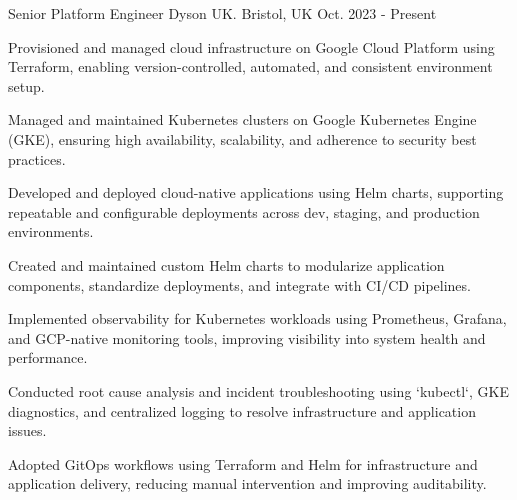 

\begin{cventries}

  \cventry
    {Senior Platform Engineer} %
    {Dyson UK.} %
    {Bristol, UK} %
    {Oct. 2023 - Present} %
    {
      \begin{cvitems} %
        \item {Provisioned and managed cloud infrastructure on Google Cloud Platform using Terraform, enabling version-controlled, automated, and consistent environment setup.}
        \item {Managed and maintained Kubernetes clusters on Google Kubernetes Engine (GKE), ensuring high availability, scalability, and adherence to security best practices.}
        \item {Developed and deployed cloud-native applications using Helm charts, supporting repeatable and configurable deployments across dev, staging, and production environments.}
        \item {Created and maintained custom Helm charts to modularize application components, standardize deployments, and integrate with CI/CD pipelines.}
        \item {Implemented observability for Kubernetes workloads using Prometheus, Grafana, and GCP-native monitoring tools, improving visibility into system health and performance.}
        \item {Conducted root cause analysis and incident troubleshooting using `kubectl`, GKE diagnostics, and centralized logging to resolve infrastructure and application issues.}
        \item {Adopted GitOps workflows using Terraform and Helm for infrastructure and application delivery, reducing manual intervention and improving auditability.}
    \end{cvitems}     
    }


\end{cventries}
